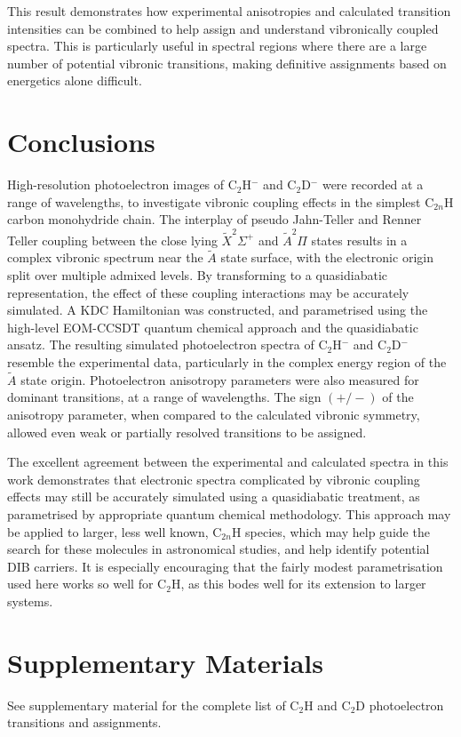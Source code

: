 \documentclass[aip,graphicx]{revtex4-1}
\begin{document}
This result demonstrates how experimental anisotropies and calculated transition intensities can be combined to help assign and understand vibronically coupled spectra. This is particularly useful in spectral regions where there are a large number of potential vibronic transitions, making definitive assignments based on energetics alone difficult.



\section{Conclusions} 
High-resolution photoelectron images of C$_2$H$^-$ and C$_2$D$^-$ were recorded at a range of wavelengths, to investigate vibronic coupling effects in the simplest C$_{2n}$H carbon monohydride chain. The interplay of pseudo Jahn-Teller and Renner Teller coupling between the close lying $\tilde{X}^2\Sigma^+$ and $\tilde{A}^2\Pi$ states results in a complex vibronic spectrum near the $\tilde{A}$ state surface, with the electronic origin split over multiple admixed levels. By transforming to a quasidiabatic representation, the effect of these coupling interactions may be accurately simulated. A KDC Hamiltonian was constructed, and parametrised using the high-level EOM-CCSDT quantum chemical approach and the quasidiabatic ansatz. The resulting simulated photoelectron spectra of C$_2$H$^-$ and C$_2$D$^-$ resemble the experimental data, particularly in the complex energy region of the $\tilde{A}$ state origin. Photoelectron anisotropy parameters were also measured for dominant transitions, at a range of wavelengths. The sign $(+/-)$ of the anisotropy parameter, when compared to the calculated vibronic symmetry, allowed even weak or partially resolved transitions to be assigned.

The excellent agreement between the experimental and calculated spectra in this work
demonstrates that electronic spectra complicated by vibronic coupling effects may still be accurately simulated using a quasidiabatic treatment, as parametrised by appropriate quantum chemical methodology. This approach may be applied to larger, less well known, C$_{2n}$H species, which may help guide the search for these molecules in astronomical studies, and help identify potential DIB carriers. It is especially encouraging that the fairly modest parametrisation used here works so well for C$_2$H, as this bodes well for its extension to larger systems.


\section*{Supplementary Materials}
See supplementary material for the complete list of C$_2$H and C$_2$D photoelectron transitions and assignments.
\end{document}
